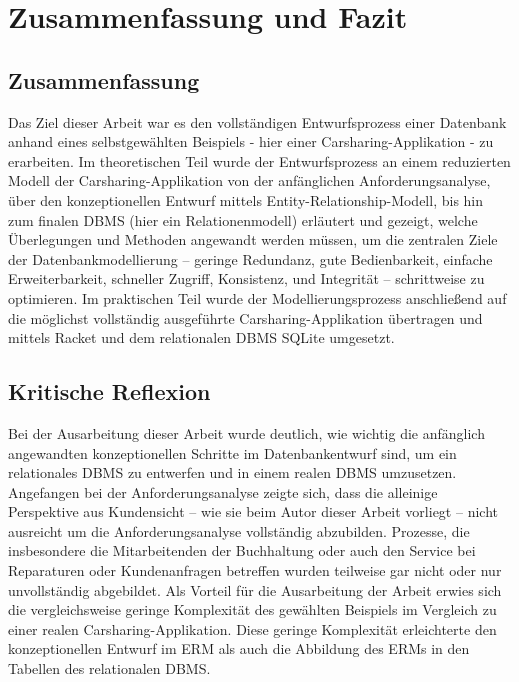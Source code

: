 \section{Zusammenfassung und Fazit}
\label{section:summary}
\subsection{Zusammenfassung}

Das Ziel dieser Arbeit war es den vollständigen Entwurfsprozess einer Datenbank anhand eines selbstgewählten Beispiels - hier einer Carsharing-Applikation - zu erarbeiten. Im theoretischen Teil wurde der Entwurfsprozess an einem reduzierten Modell der Carsharing-Applikation von der anfänglichen Anforderungsanalyse, über den konzeptionellen Entwurf mittels Entity-Relationship-Modell, bis hin zum finalen DBMS (hier ein Relationenmodell) erläutert und gezeigt, welche Überlegungen und Methoden angewandt werden müssen, um die zentralen Ziele der Datenbankmodellierung -- geringe Redundanz, gute Bedienbarkeit, einfache Erweiterbarkeit, schneller Zugriff, Konsistenz, und Integrität -- schrittweise zu optimieren. Im praktischen Teil wurde der Modellierungsprozess anschließend auf die möglichst vollständig ausgeführte Carsharing-Applikation übertragen und mittels Racket und dem relationalen DBMS SQLite umgesetzt.

\subsection{Kritische Reflexion}

Bei der Ausarbeitung dieser Arbeit wurde deutlich, wie wichtig die anfänglich angewandten konzeptionellen Schritte im Datenbankentwurf sind, um ein relationales DBMS zu entwerfen und in einem realen DBMS umzusetzen. Angefangen bei der Anforderungsanalyse zeigte sich, dass die alleinige Perspektive aus Kundensicht -- wie sie beim Autor dieser Arbeit vorliegt -- nicht ausreicht um die Anforderungsanalyse vollständig abzubilden. Prozesse, die insbesondere die Mitarbeitenden der Buchhaltung oder auch den Service bei Reparaturen oder Kundenanfragen betreffen wurden teilweise gar nicht oder nur unvollständig abgebildet. Als Vorteil für die Ausarbeitung der Arbeit erwies sich die vergleichsweise geringe Komplexität des gewählten Beispiels im Vergleich zu einer realen Carsharing-Applikation. Diese geringe Komplexität erleichterte den konzeptionellen Entwurf im ERM als auch die Abbildung des ERMs in den Tabellen des relationalen DBMS. 

